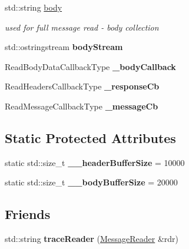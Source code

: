 \begin{DoxyCompactItemize}
\mbox{\label{class_message_reader_a47692db94154e8ba7efda892403df476}} 
std\+::string \hyperlink{class_message_reader_a47692db94154e8ba7efda892403df476}{body}
\begin{DoxyCompactList}\small\item\em used for full message read -\/ body collection \end{DoxyCompactList}\item 
\mbox{\label{class_message_reader_a37fd89ff6258ad48b915e625558e1bbc}} 
std\+::ostringstream {\bfseries body\+Stream}
\item 
\mbox{\label{class_message_reader_aeb3d223497993154acca83dc6ec9eaa2}} 
Read\+Body\+Data\+Callback\+Type {\bfseries \+\_\+body\+Callback}
\item 
\mbox{\label{class_message_reader_a146a65cba204e9aa401484adc230be32}} 
Read\+Headers\+Callback\+Type {\bfseries \+\_\+response\+Cb}
\item 
\mbox{\label{class_message_reader_a7ad01d613200dec83fb0d0a6a71edb77}} 
Read\+Message\+Callback\+Type {\bfseries \+\_\+message\+Cb}
\end{DoxyCompactItemize}
\subsection*{Static Protected Attributes}
\begin{DoxyCompactItemize}
\item 
\mbox{\label{class_message_reader_a99feadce4d7a038210448aec87a44d90}} 
static std\+::size\+\_\+t {\bfseries \+\_\+\+\_\+header\+Buffer\+Size} = 10000
\item 
\mbox{\label{class_message_reader_a7881cc09f4b6f7e45aa21c5a613d7d2c}} 
static std\+::size\+\_\+t {\bfseries \+\_\+\+\_\+body\+Buffer\+Size} = 20000
\end{DoxyCompactItemize}
\subsection*{Friends}
\begin{DoxyCompactItemize}
\item 
\mbox{\label{class_message_reader_a15c731cddafc776dccca9000ad701b43}} 
std\+::string {\bfseries trace\+Reader} (\hyperlink{class_message_reader}{Message\+Reader} \&rdr)
\end{DoxyCompactItemize}


